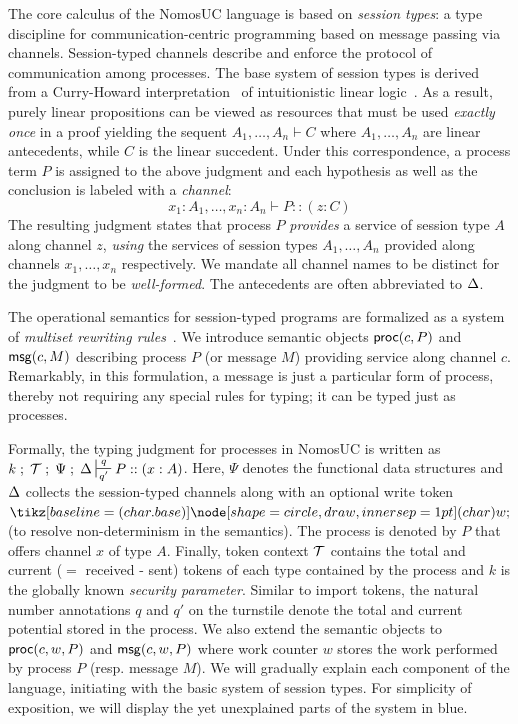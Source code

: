 
The core calculus of the NomosUC language is based on
\emph{session types}: a type discipline for communication-centric programming
based on message passing via channels. Session-typed channels describe and
enforce the protocol of communication among processes. The base system of
session types is derived from a Curry-Howard interpretation~\cite{caires2010session}
of intuitionistic linear logic~\cite{girard1987linear}.
As a result, purely linear
propositions can be viewed as resources that must be used \emph{exactly
once} in a proof yielding the sequent $A_1, \ldots, A_n \vdash C$
where $A_1, \ldots, A_n$ are linear antecedents, while $C$ is the linear
succedent. Under this correspondence, a process term $P$ is assigned to
the above judgment and each hypothesis as well as the conclusion is
labeled with a \emph{channel}:
\[
x_1 : A_1, \ldots, x_n : A_n \vdash P :: (z : C)
\]
The resulting judgment states that process $P$ \emph{provides} a service
of session type $A$ along channel $z$, \emph{using} the services of session
types $A_1, \ldots, A_n$ provided along channels $x_1, \ldots, x_n$
respectively. We mandate all channel names to be distinct for the judgment
to be \emph{well-formed}. The antecedents are often abbreviated to $\Delta$.

The operational semantics for session-typed programs are formalized as a
system of \emph{multiset rewriting rules}~\cite{cervesato2009relating}.
We introduce semantic objects $\mathsf{proc}(c, P)$ and $\mathsf{msg}(c, M)$ describing
process $P$ (or message $M$) providing service along channel $c$.
Remarkably, in this formulation, a message is just a particular form of process,
thereby not requiring any special rules for typing; it can be typed just as processes.

Formally, the typing judgment for processes in NomosUC is written as
$k \semi \Tokens \semi \Psi \semi \D \entailpot{q}{q'} P :: (x : A)$.
Here, $\Psi$ denotes the functional data structures and $\Delta$ collects the
session-typed channels along with an optional write token $\wt$
(to resolve non-determinism in the semantics).
The process is denoted by $P$ that offers channel $x$ of type $A$.
Finally, token context $\mathcal{T}$ contains the total and current ($=$ received - sent)
tokens of each type contained by the process and $k$ is the globally known \emph{security parameter}.
Similar to import tokens, the natural number annotations $q$ and $q'$ on the turnstile
denote the total and current potential stored in the process.
We also extend the semantic objects to $\mathsf{proc}(c, w, P)$ and $\mathsf{msg}(c, w, P)$
where work counter $w$ stores the work performed by process $P$ (resp.
message $M$).
We will gradually explain each component of the language, initiating
with the basic system of session types.
For simplicity of exposition, we will display the yet unexplained
parts of the system in blue.

